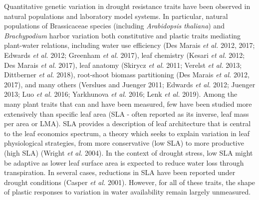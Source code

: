 \documentclass[jou,floatsintext]{apa6}
\begin{document}
Quantitative genetic variation in drought resistance traits have been observed in natural populations and laboratory model systems. In particular, natural populations of Brassicaceae species (including \emph{Arabidopsis thaliana}) and \emph{Brachypodium} harbor variation both constitutive and plastic traits mediating plant-water relations, including water use efficiency (Des Marais \emph{et al.} 2012, 2017; Edwards \emph{et al.} 2012; Greenham \emph{et al.} 2017), leaf chemistry (Kesari \emph{et al.} 2012; Des Marais \emph{et al.} 2017), leaf anatomy (Skirycz \emph{et al.} 2011; Verelst \emph{et al.} 2013; Dittberner \emph{et al.} 2018), root-shoot biomass partitioning (Des Marais \emph{et al.} 2012, 2017), and many others (Verslues and Juenger 2011; Edwards \emph{et al.} 2012; Juenger 2013; Luo \emph{et al.} 2016; Yarkhunova \emph{et al.} 2016; Lenk \emph{et al.} 2019). Among the many plant traits that can and have been measured, few have been studied more extensively than specific leaf area (SLA - often reported as its inverse, leaf mass per area or LMA). SLA provides a description of leaf architecture that is central to the leaf economics spectrum, a theory which seeks to explain variation in leaf physiological strategies, from more conservative (low SLA) to more productive (high SLA) (Wright \emph{et al.} 2004). In the context of drought stress, low SLA might be adaptive as lower leaf surface area is expected to reduce water loss through transpiration. In several cases, reductions in SLA have been reported under drought conditions (Casper \emph{et al.} 2001). However, for all of these traits, the shape of plastic responses to variation in water availability remain largely unmeasured.
\end{document}
